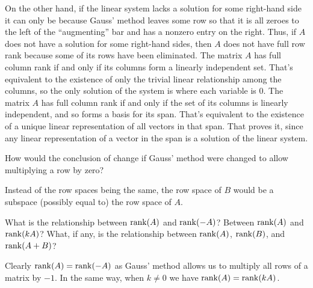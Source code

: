\begin{exercises}
\begin{answer}
\begin{exparts}
          On the other hand, if the linear system lacks a solution for some
          right-hand side it can only be because Gauss' method leaves some row
          so that it is all zeroes to the left of the ``augmenting'' bar 
          and has a nonzero entry on the right.
          Thus, if $A$ does not have a solution for some right-hand sides,
          then \( A \) does not have full row rank because some of its rows
          have been eliminated.
        \partsitem The matrix \( A \) has full column rank if and only
          if its columns
          form a linearly independent set.
          That's equivalent to the existence of only the trivial linear
          relationship among the columns, so the only solution of the
          system is where each variable is $0$.
        \partsitem The matrix \( A \) has full column rank if and only
          if the set of
          its columns is linearly independent, and so forms a basis for
          its span.
          That's equivalent to the existence of a unique linear representation
          of all vectors in that span.
          That proves it, 
          since any linear representation of a vector in the span is a 
          solution of the linear system.
      \end{exparts}  
    \end{answer}
  \item 
    How would the conclusion of  change
    if Gauss' method were changed to allow multiplying a row by zero?
    \begin{answer}
      Instead of the row spaces being the same, the row space of $B$
      would be a subspace (possibly equal to) the row space of $A$.
    \end{answer}
  \recommended \item
    What is the relationship between \( \operatorname{rank}(A) \) and \( \operatorname{rank}(-A) \)?
    Between \( \operatorname{rank}(A) \) and \( \operatorname{rank}(kA) \)?
    What, if any, is the relationship between \( \operatorname{rank}(A) \), \( \operatorname{rank}(B) \),
    and \( \operatorname{rank}(A+B) \)?
    \begin{answer}
      Clearly \( \operatorname{rank}(A)=\operatorname{rank}(-A) \) as Gauss' method allows us to
      multiply all rows of a matrix by \( -1 \).
      In the same way, when \( k\neq 0 \) we have \( \operatorname{rank}(A)=\operatorname{rank}(kA) \).


\end{answer}
\end{exercises}
